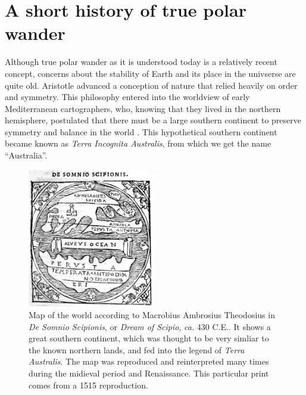 \section{A short history of true polar wander}

Although true polar wander as it is understood today is a relatively recent concept,
concerns about the stability of Earth and its place in the univserse are quite old.
Aristotle advanced a conception of nature that relied heavily on order and symmetry.
This philosophy entered into the worldview of early Mediterranean cartographers, who, knowing that
they lived in the northern hemisphere, postulated that there must be a large
southern continent to preserve symmetry and balance in the world \citep{wilford2001mapmakers}.
This hypothetical southern continent became known as \emph{Terra Incognita Australis}, from which
we get the name ``Australia''.

\begin{figure}
\centering
\includegraphics[width=0.5\textwidth]{intro/figures/macrobius.jpg}
\caption[Map of the world according to Macrobius.]{Map of the world according to Macrobius Ambrosius Theodosius in \emph{De Somnio Scipionis}, or \emph{Dream of Scipio}, \emph{ca.} 430 C.E..
It shows a great southern continent, which was thought to be very simliar to the known northern lands, and fed into the legend of \emph{Terra Australis}.
The map was reproduced and reinterpreted many times during the midieval period and Renaissance. This particular print comes from a 1515 reproduction.}
\label{fig:macrobius}
\end{figure}

